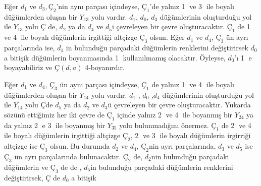 \documentclass[11pt]{amsbook}
\begin{document}

	Eğer $d_1$ ve $d_3, Ç_2$'nin aynı parçası içindeyse, $Ç_1$'de yalnız {\large \textcircled{\small 1}} ve {\large \textcircled{\small 3}}  ile boyalı
	düğümlerden oluşan bir $Y_{13}$ yolu vardır. $d_{1}$, $ d_{0}$, $ d_{3}$ düğümlerinin oluşturduğu yol ile $Y_{13}$ yolu $Ç$ de, $d_2$ ya da $d_4$ ve
	$d_5$i çevreleyen bir çevre oluşturacaktır. $Ç_1$ de {\large \textcircled{\small 1}} ve {\large \textcircled{\small 4}} ile boyalı düğümlerin irgittiği
	altçizge $Ç_3$ olsun. Eğer $d_1$ ve $d_4$, $Ç_3$ ün ayrı parçalarında ise, $d_1$ in bulunduğu parçadaki düğümlerin renklerini değiştirirsek $d_0$a bitişik düğümlerin boyanmasında {\large \textcircled{\small 1}} 
	kullanılmamış olacaktır. Öyleyse, $d_0$'ı {\large \textcircled{\small 1}} e boyayabiliriz ve $Ç(d,a)$ 4-boyanırdır.
	
	Eğer $d_1$ ve $d_4$, $Ç_3$ ün aynı parçası içindeyse, $Ç_1$ de yalnız {\large \textcircled{\small 1}} ve {\large \textcircled{\small 4}} ile boyalı düğümlerden oluşan bir $ Y_{14}$
	yolu vardır. $d_1$ , $d_0$ ,$d_4$ düğümlerinin oluşturduğu yol ile $Y_{14}$ yolu $Ç$de $d_5$ ya da $d_2$ ve $d_3$ü çevreleyen bir çevre oluşturacaktır. Yukarda sözünü ettiğimiz her iki 		çevre de $Ç_1$ içinde yalnız {\large \textcircled{\small 2}}  ve {\large \textcircled{\small 4}}  ile boyanmış bir $Y_{24}$ ya da yalnız {\large \textcircled{\small 2}}  e {\large 					\textcircled{\small 3}}  ile boyanmış bir $Y_{35}$  yolu bulunmadığını önermez. $Ç_1$ de {\large \textcircled{\small 2}}  ve {\large \textcircled{\small 4}}  ile boyalı düğümlerin irgittiği 			altçizge $Ç_2$, {\large \textcircled{\small 2}}  ve {\large \textcircled{\small 3}} ile boyalı düğümlerin irgirriği altçizge ise $Ç_3$ olsun. Bu durumda $d_2$ ve $d_4$, $Ç_2$nin ayrı				parçalarında, $d_3$ ve $d_5$ ise $Ç_3$ ün ayrı parçalarında bulunacaktır. $Ç_2$ de, $d_2$nin bulunduğu parçadaki düğümlerin ve $Ç_3$ de de , $d_5$in bulunduğu parçadaki düğümlerin 		renklerini değiştirirsek, $Ç$ de $d_0$ a bitişik
\end{document}
